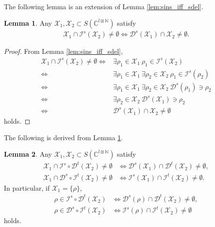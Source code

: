 \documentclass[reprint,amsmath,amssymb,aps,]{revtex4-2}
\theoremstyle{definition}
\newtheorem{lem}{Lemma}
\newcommand{\SET}[1]{\mathbb{#1}}
\newcommand{\N}{\SET{N}}
\newcommand{\C}{\SET{C}}
\newcommand{\1}{\mbox{1}\hspace{-0.25em}\mbox{l}}%
\newcommand{\pure}[2]{\C^{#1 \otimes #2}}
\newcommand{\state}[2]{S(\pure{#1}{#2})}
\newcommand{\QU}[1]{\mathcal{#1}}
\begin{document}
The following lemma is an extension of Lemma \ref{lem:sins_iff_sdel}.

\begin{lem}
  \label{lem:sins_iff_sdel_kai}
  Any $\QU{X}_1, \QU{X}_2 \subset \state{l}{\N}$ satisfy
  \begin{align*}
    \QU{X}_1 \cap \QU{I}^s(\QU{X}_2)
    \neq
    \emptyset
    \iff
    \QU{D}^s(\QU{X}_1) \cap \QU{X}_2
    \neq
    \emptyset.
  \end{align*}
\end{lem}

\begin{proof}
  From Lemma \ref{lem:sins_iff_sdel},
  \begin{align*}
    \QU{X}_1 \cap \QU{I}^s(\QU{X}_2)
    \neq
    \emptyset
    \iff&
    \exists
    \rho_1 \in \QU{X}_1
    ~
    \rho_1 \in \QU{I}^s(\QU{X}_2)\\
    \iff&
    \exists
    \rho_1 \in \QU{X}_1
    ~
    \exists
    \rho_2 \in \QU{X}_2
    ~
    \rho_1 \in \QU{I}^s(\rho_2)\\
    \iff&
    \exists
    \rho_1 \in \QU{X}_1
    ~
    \exists
    \rho_2 \in \QU{X}_2
    ~
    \QU{D}^s(\rho_1) \ni \rho_2\\
    \iff&
    \exists
    \rho_2 \in \QU{X}_2
    ~
    \QU{D}^s(\QU{X}_1) \ni \rho_2\\
    \iff&
    \QU{D}^s(\QU{X}_1) \cap \QU{X}_2
    \neq
    \emptyset
  \end{align*}
  holds.
\end{proof}

The following is derived
from Lemma \ref{lem:sins_iff_sdel_kai}.

\begin{lem}
  \label{lem:sub_set}
  Any $\QU{X}_1,\QU{X}_2 \subset \state{l}{\N}$ satisfy
  \begin{align*}
    \QU{X}_1
    \cap
    \QU{I}^s \circ \QU{D}^t(\QU{X}_2)
    \neq
    \emptyset
    &\iff
    \QU{D}^s(\QU{X}_1) \cap \QU{D}^t(\QU{X}_2)
    \neq
    \emptyset,\\
    \QU{X}_1
    \cap
    \QU{D}^s \circ \QU{I}^t(\QU{X}_2)
    \neq
    \emptyset
    &\iff
    \QU{I}^s(\QU{X}_1) \cap \QU{I}^t(\QU{X}_2)
    \neq
    \emptyset.
  \end{align*}
  In particular,
  if $\QU{X}_1 = \{ \rho \}$,
  \begin{align*}
    \rho
    \in
    \QU{I}^s \circ \QU{D}^t(\QU{X}_2)
    &\iff
    \QU{D}^s(\rho) \cap \QU{D}^t(\QU{X}_2)
    \neq
    \emptyset,\\
    \rho
    \in
    \QU{D}^s \circ \QU{I}^t(\QU{X}_2)
    &\iff
    \QU{I}^s(\rho) \cap \QU{I}^t(\QU{X}_2)
    \neq
    \emptyset
  \end{align*}
  holds.
\end{lem}
\end{document}
